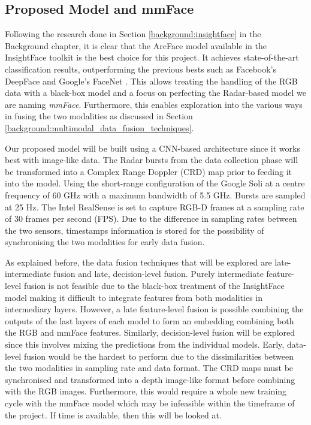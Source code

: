 \documentclass{interim}
\begin{document}
\subsection{Proposed Model and mmFace}
Following the research done in Section \ref{background:insightface} in the Background chapter, it is clear that the ArcFace model available in the InsightFace toolkit is the best choice for this project. It achieves state-of-the-art classification results, outperforming the previous bests such as Facebook's DeepFace \cite{taigman2014deepface} and Google's FaceNet \cite{schroff2015facenet}. This allows treating the handling of the RGB data with a black-box model and a focus on perfecting the Radar-based model we are naming \textit{mmFace}. Furthermore, this enables exploration into the various ways in fusing the two modalities as discussed in Section \ref{background:multimodal_data_fusion_techniques}. 

Our proposed model will be built using a CNN-based architecture since it works best with image-like data. The Radar bursts from the data collection phase will be transformed into a Complex Range Doppler (CRD) map \cite{lien2016soli, hayashi2021radarnet} prior to feeding it into the model. Using the short-range configuration of the Google Soli at a centre frequency of 60 GHz with a maximum bandwidth of 5.5 GHz. Bursts are sampled at 25 Hz. The Intel RealSense is set to capture RGB-D frames at a sampling rate of 30 frames per second (FPS). Due to the difference in sampling rates between the two sensors, timestamps information is stored for the possibility of synchronising the two modalities for early data fusion.

As explained before, the data fusion techniques that will be explored are late-intermediate fusion and late, decision-level fusion. Purely intermediate feature-level fusion is not feasible due to the black-box treatment of the InsightFace model making it difficult to integrate features from both modalities in intermediary layers. However, a late feature-level fusion is possible combining the outputs of the last layers of each model to form an embedding combining both the RGB and mmFace features. Similarly, decision-level fusion will be explored since this involves mixing the predictions from the individual models. Early, data-level fusion would be the hardest to perform due to the dissimilarities between the two modalities in sampling rate and data format. The CRD maps must be synchronised and transformed into a depth image-like format before combining with the RGB images. Furthermore, this would require a whole new training cycle with the mmFace model which may be infeasible within the timeframe of the project. If time is available, then this will be looked at.
\end{document}
